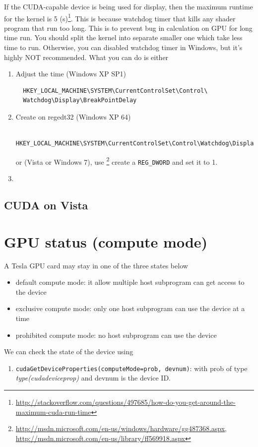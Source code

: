 If the CUDA-capable device is being used for display, then the maximum runtime
for the kernel is 5
(s)\footnote{\url{http://stackoverflow.com/questions/497685/how-do-you-get-around-the-maximum-cuda-run-time}}.
This is because watchdog timer that kills any shader program that run too long. This is to prevent bug in calculation on GPU for long time run. You should split the kernel into separate smaller one which take less
time to run. Otherwise, you can disabled watchdog timer in Windows, but it's
highly NOT recommended. What you can do is either
\begin{enumerate}
  \item Adjust the time (Windows XP SP1)
  \begin{verbatim}
  HKEY_LOCAL_MACHINE\SYSTEM\CurrentControlSet\Control\
  Watchdog\Display\BreakPointDelay
  \end{verbatim}
  
  \item Create on regedt32 (Windows XP 64)
  \begin{verbatim}
   HKEY_LOCAL_MACHINE\SYSTEM\CurrentControlSet\Control\Watchdog\Display\DisableBugCheck
  \end{verbatim}
  or (Vista or Windows 7), use
  \footnote{\url{http://msdn.microsoft.com/en-us/windows/hardware/gg487368.aspx,
  http://msdn.microsoft.com/en-us/library/ff569918.aspx}} create a
  \verb!REG_DWORD! and set it to 1.
  \item 
\end{enumerate}


\subsection{CUDA on Vista}
\label{sec:cuda-vista}


\section{GPU status (compute mode)}
\label{sec:gpu-status}

A Tesla GPU card may stay in one of the three states below
\begin{itemize}
\item default compute mode: it allow multiple host subprogram can get
  access to the device
\item exclusive compute mode: only one host subprogram can use the
  device at a time
\item prohibited compute mode: no host subprogram can use the device
\end{itemize}
We can check the state of the device using
\begin{enumerate}
\item \verb.cudaGetDeviceProperties(computeMode=prob, devnum).: with
  prob of type {\it type(cudadeviceprop)} and devnum is the device ID.
\end{enumerate}

